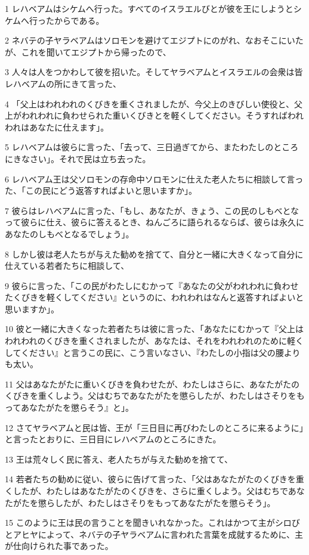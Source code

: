 \par 1 レハベアムはシケムへ行った。すべてのイスラエルびとが彼を王にしようとシケムへ行ったからである。
\par 2 ネバテの子ヤラベアムはソロモンを避けてエジプトにのがれ、なおそこにいたが、これを聞いてエジプトから帰ったので、
\par 3 人々は人をつかわして彼を招いた。そしてヤラベアムとイスラエルの会衆は皆レハベアムの所にきて言った、
\par 4 「父上はわれわれのくびきを重くされましたが、今父上のきびしい使役と、父上がわれわれに負わせられた重いくびきとを軽くしてください。そうすればわれわれはあなたに仕えます」。
\par 5 レハベアムは彼らに言った、「去って、三日過ぎてから、またわたしのところにきなさい」。それで民は立ち去った。
\par 6 レハベアム王は父ソロモンの存命中ソロモンに仕えた老人たちに相談して言った、「この民にどう返答すればよいと思いますか」。
\par 7 彼らはレハベアムに言った、「もし、あなたが、きょう、この民のしもべとなって彼らに仕え、彼らに答えるとき、ねんごろに語られるならば、彼らは永久にあなたのしもべとなるでしょう」。
\par 8 しかし彼は老人たちが与えた勧めを捨てて、自分と一緒に大きくなって自分に仕えている若者たちに相談して、
\par 9 彼らに言った、「この民がわたしにむかって『あなたの父がわれわれに負わせたくびきを軽くしてください』というのに、われわれはなんと返答すればよいと思いますか」。
\par 10 彼と一緒に大きくなった若者たちは彼に言った、「あなたにむかって『父上はわれわれのくびきを重くされましたが、あなたは、それをわれわれのために軽くしてください』と言うこの民に、こう言いなさい、『わたしの小指は父の腰よりも太い。
\par 11 父はあなたがたに重いくびきを負わせたが、わたしはさらに、あなたがたのくびきを重くしよう。父はむちであなたがたを懲らしたが、わたしはさそりをもってあなたがたを懲らそう』と」。
\par 12 さてヤラベアムと民は皆、王が「三日目に再びわたしのところに来るように」と言ったとおりに、三日目にレハベアムのところにきた。
\par 13 王は荒々しく民に答え、老人たちが与えた勧めを捨てて、
\par 14 若者たちの勧めに従い、彼らに告げて言った、「父はあなたがたのくびきを重くしたが、わたしはあなたがたのくびきを、さらに重くしよう。父はむちであなたがたを懲らしたが、わたしはさそりをもってあなたがたを懲らそう」。
\par 15 このように王は民の言うことを聞きいれなかった。これはかつて主がシロびとアヒヤによって、ネバテの子ヤラベアムに言われた言葉を成就するために、主が仕向けられた事であった。
